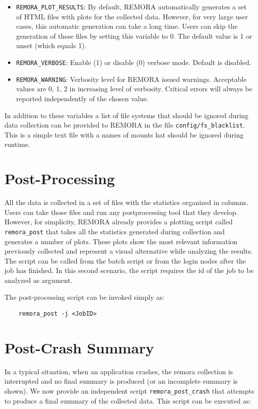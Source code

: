 \documentclass[10pt,a4paper]{report}
\begin{document}
{\begin{itemize}
    \item \texttt{REMORA\_PLOT\_RESULTS}: By default, REMORA automatically generates a set of HTML files with plots for the collected data. However, for very large user cases, this automatic generation can take a long time. Users can skip the generation of these files by setting this variable to 0. The default value is 1 or unset (which equals 1).
	
	\item \texttt{REMORA\_VERBOSE}: Enable (1) or disable (0) verbose mode. Default is disabled.
	
	\item \texttt{REMORA\_WARNING}: Verbosity level for REMORA issued warnings. Acceptable values are 0, 1, 2 in increasing level of verbosity. Critical errors will always be reported independently of the chosen value.
\end{itemize}
}

In addition to these variables a list of file systems that should be ignored during data collection can be provided to REMORA in the file \verb+config/fs_blacklist+. This is a simple text file with a names of mounts hat should be ignored during runtime.

\section{Post-Processing}
All the data is collected in a set of files with the statistics organized in columns. Users can take those files and run any postprocessing tool that they develop. However, for simplicity, REMORA already provides a plotting script called \verb+remora_post+ that takes all the statistics generated during collection and generates a number of plots. These plots show the most relevant information previously collected and represent a visual alternative while analyzing the results. The script can be called from the batch script or from the login nodes after the job has finished. In this second scenario, the script requires the id of the job to be analyzed as argument.

The post-processing script can be invoked simply as:

\begin{verbatim}
	remora_post -j <JobID>
\end{verbatim}

\section{Post-Crash Summary}
In a typical situation, when an application crashes, the remora collection is interrupted and no final summary is produced (or an incomplete summary is shown). We now provide an independent script \texttt{remora\_post\_crash} that attempts to produce a final summary of the collected data. This script can be executed as:
\end{document}
